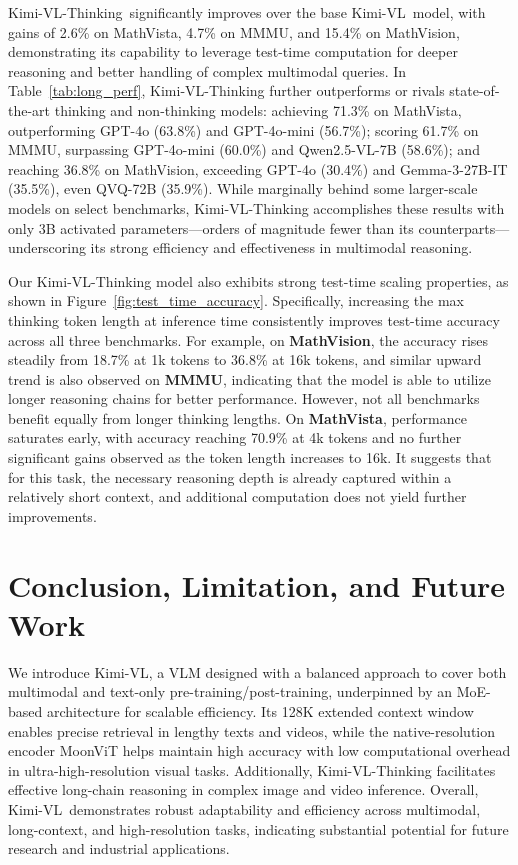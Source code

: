 \documentclass{article}
\newcommand{\ourname}{{Kimi-VL}}
\newcommand{\ourreasoningname}{{\ourname-Thinking}}
\begin{document}
\ourreasoningname~significantly improves over the base \ourname~model, with gains of 2.6\% on MathVista, 4.7\% on MMMU, and 15.4\% on MathVision, demonstrating its capability to leverage test-time computation for deeper reasoning and better handling of complex multimodal queries. In Table~\ref{tab:long_perf}, \ourname-Thinking further outperforms or rivals state-of-the-art thinking and non-thinking models: achieving 71.3\% on MathVista, outperforming GPT-4o (63.8\%) and GPT-4o-mini (56.7\%); scoring 61.7\% on MMMU, surpassing GPT-4o-mini (60.0\%) and Qwen2.5-VL-7B (58.6\%); and reaching 36.8\% on MathVision, exceeding GPT-4o (30.4\%) and Gemma-3-27B-IT (35.5\%), even QVQ-72B (35.9\%). While marginally behind some larger-scale models on select benchmarks, \ourname-Thinking accomplishes these results with only 3B activated parameters—orders of magnitude fewer than its counterparts—underscoring its strong efficiency and effectiveness in multimodal reasoning.


Our Kimi-VL-Thinking model also exhibits strong test-time scaling properties, as shown in Figure~\ref{fig:test_time_accuracy}. Specifically, increasing the max thinking token length at inference time consistently improves test-time accuracy across all three benchmarks. For example, on \textbf{MathVision}, the accuracy rises steadily from 18.7\% at 1k tokens to 36.8\% at 16k tokens, and similar upward trend is also observed on \textbf{MMMU}, indicating that the model is able to utilize longer reasoning chains for better performance.
However, not all benchmarks benefit equally from longer thinking lengths. On \textbf{MathVista}, performance saturates early, with accuracy reaching 70.9\% at 4k tokens and no further significant gains observed as the token length increases to 16k. It suggests that for this task, the necessary reasoning depth is already captured within a relatively short context, and additional computation does not yield further improvements. 



\section{Conclusion, Limitation, and Future Work}


We introduce \ourname, a VLM designed with a balanced approach to cover both multimodal and text-only pre-training/post-training, underpinned by an MoE-based architecture for scalable efficiency. Its 128K extended context window enables precise retrieval in lengthy texts and videos, while the native-resolution encoder MoonViT helps maintain high accuracy with low computational overhead in ultra-high-resolution visual tasks. Additionally, \ourname-Thinking facilitates effective long-chain reasoning in complex image and video inference. Overall, \ourname~demonstrates robust adaptability and efficiency across multimodal, long-context, and high-resolution tasks, indicating substantial potential for future research and industrial applications.
\end{document}
